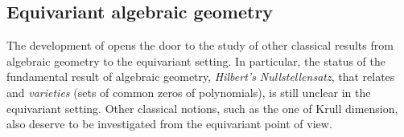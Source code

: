%
\subsection{Equivariant algebraic geometry} The development of  opens the door to the study of other classical results from
algebraic geometry to the equivariant setting. In particular, the status of the
fundamental result of algebraic geometry, \emph{Hilbert's Nullstellensatz},
that relates  and \emph{varieties} (sets of common zeros of
polynomials), is still unclear in the equivariant setting. Other classical
notions, such as the one of Krull dimension, also deserve to be investigated
from the equivariant point of view.


